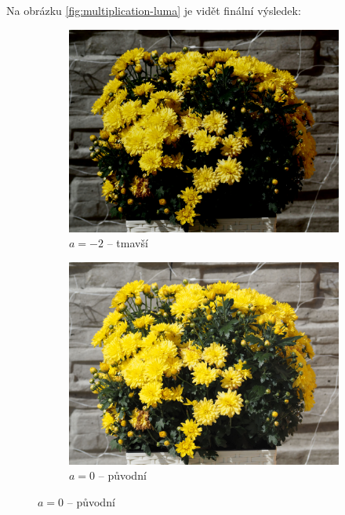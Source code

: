 \documentclass[11pt, a4paper, titlepage]{article}
\begin{document}
Na obrázku \ref{fig:multiplication-luma} je vidět finální výsledek:
\begin{figure}[h]
    \centering
    \begin{subfigure}[t]{0.25\textwidth}
        \vskip 0pt
        \includegraphics[width=1.0\textwidth]{kvetina_mul_down.jpg}
        \caption{$a = -2$ -- tmavší}
    \end{subfigure}
    \hspace{1cm}
    \begin{subfigure}[t]{0.25\textwidth}
        \vskip 0pt
        \includegraphics[width=1.0\textwidth]{kvetina.jpg}
        \caption{$a = 0$ -- původní}
    \end{subfigure}
    \hspace{1cm}

\end{figure}
\end{document}
